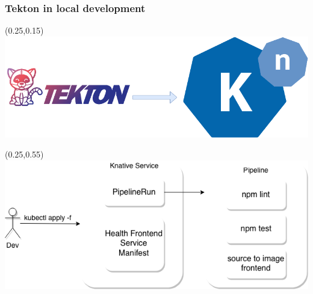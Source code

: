 \documentclass[aspectratio=169,11pt,hyperref={colorlinks=true}]{beamer}
\begin{document}
\begin{lblackrwhiteframe}
\begin{lblackrwhiteframe}
\begin{blackframe}
\begin{whiteframe}
\begin{grayframe}
  \frametitle{Tekton in local development}
  \begin{textblock*}{0.45\paperwidth}(0.25\paperwidth,0.15\paperheight)
    \centering
    \includegraphics[width=0.45\paperwidth]{img/knative+tekton.png}
  \end{textblock*}
  \begin{textblock*}{0.45\paperwidth}(0.25\paperwidth,0.55\paperheight)
    \includegraphics[width=0.45\paperwidth]{img/tekton_dev.png}
  \end{textblock*}
\end{grayframe}


\end{whiteframe}
\end{blackframe}
\end{lblackrwhiteframe}
\end{lblackrwhiteframe}
\end{document}
